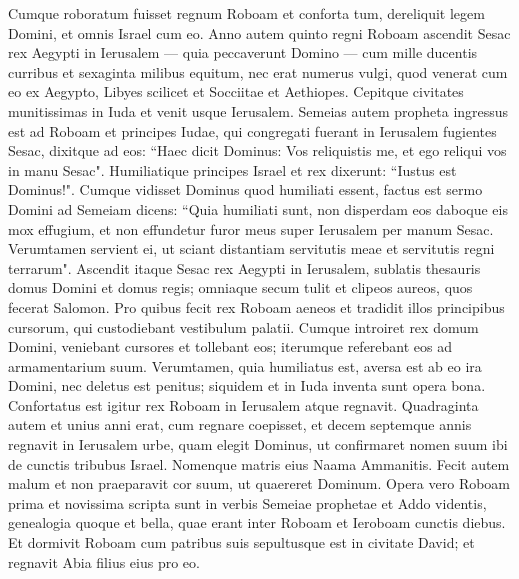 \begin{biblechapter}  
\verse Cumque roboratum fuisset regnum Roboam et conforta tum, dereliquit legem Domini, et omnis Israel cum eo. 
\verse Anno autem quinto regni Roboam ascendit Sesac rex Aegypti in Ierusalem — quia peccaverunt Domino — 
\verse cum mille ducentis curribus et sexaginta milibus equitum, nec erat numerus vulgi, quod venerat cum eo ex Aegypto, Libyes scilicet et Socciitae et Aethiopes. 
\verse Cepitque civitates munitissimas in Iuda et venit usque Ierusalem. 
\verse Semeias autem propheta ingressus est ad Roboam et principes Iudae, qui congregati fuerant in Ierusalem fugientes Sesac, dixitque ad eos: “Haec dicit Dominus: Vos reliquistis me, et ego reliqui vos in manu Sesac". 
\verse Humiliatique principes Israel et rex dixerunt: “Iustus est Dominus!". 
\verse Cumque vidisset Dominus quod humiliati essent, factus est sermo Domini ad Semeiam dicens: “Quia humiliati sunt, non disperdam eos daboque eis mox effugium, et non effundetur furor meus super Ierusalem per manum Sesac. 
\verse Verumtamen servient ei, ut sciant distantiam servitutis meae et servitutis regni terrarum". 
\verse Ascendit itaque Sesac rex Aegypti in Ierusalem, sublatis thesauris domus Domini et domus regis; omniaque secum tulit et clipeos aureos, quos fecerat Salomon. 
\verse Pro quibus fecit rex Roboam aeneos et tradidit illos principibus cursorum, qui custodiebant vestibulum palatii. 
\verse Cumque introiret rex domum Domini, veniebant cursores et tollebant eos; iterumque referebant eos ad armamentarium suum. 
\verse Verumtamen, quia humiliatus est, aversa est ab eo ira Domini, nec deletus est penitus; siquidem et in Iuda inventa sunt opera bona. 
\verse Confortatus est igitur rex Roboam in Ierusalem atque regnavit. Quadraginta autem et unius anni erat, cum regnare coepisset, et decem septemque annis regnavit in Ierusalem urbe, quam elegit Dominus, ut confirmaret nomen suum ibi de cunctis tribubus Israel. Nomenque matris eius Naama Ammanitis. 
\verse Fecit autem malum et non praeparavit cor suum, ut quaereret Dominum. 
\verse Opera vero Roboam prima et novissima scripta sunt in verbis Semeiae prophetae et Addo videntis, genealogia quoque et bella, quae erant inter Roboam et Ieroboam cunctis diebus. 
\verse Et dormivit Roboam cum patribus suis sepultusque est in civitate David; et regnavit Abia filius eius pro eo. 
\end{biblechapter}

